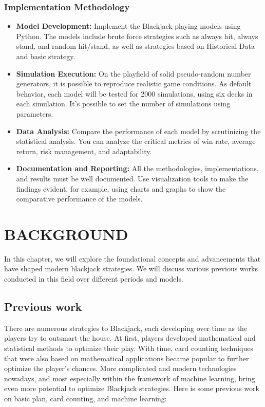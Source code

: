 \documentclass[a4paper,12pt]{report}
\begin{document}
\subsection{Implementation Methodology}
\begin{itemize}
\item \textbf{Model Development:} Implement the Blackjack-playing models using Python. The models include brute force strategies such as always hit, always stand, and random hit/stand, as well as strategies based on Historical Data and basic strategy.
\vspace\baselineskip
\item \textbf{Simulation Execution:} On the playfield of solid pseudo-random number generators, it is possible to reproduce realistic game conditions. As default behavior, each model will be tested for 2000 simulations, using six decks in each simulation. It's possible to set the number of simulations using parameters.
\vspace\baselineskip
\item \textbf{Data Analysis:} Compare the performance of each model by scrutinizing the statistical analysis. You can analyze the critical metrics of win rate, average return, risk management, and adaptability.
\vspace\baselineskip
\item \textbf{Documentation and Reporting:} All the methodologies, implementations, and results must be well documented. Use visualization tools to make the findings evident, for example, using charts and graphs to show the comparative performance of the models.
\end{itemize}


\chapter{BACKGROUND}
\label{chapter:background}

In this chapter, we will explore the foundational concepts and advancements that have shaped modern blackjack strategies. We will discuss various previous works conducted in this field over different periods and models.

\section{Previous work}
There are numerous strategies to Blackjack, each developing over time as the players try to outsmart the house. At first, players developed mathematical and statistical methods to optimize their play. With time, card counting techniques that were also based on mathematical applications became popular to further optimize the player's chances. More complicated and modern technologies nowadays, and most especially within the framework of machine learning, bring even more potential to optimize Blackjack strategies. Here is some previous work on basic plan, card counting, and machine learning:
\end{document}
